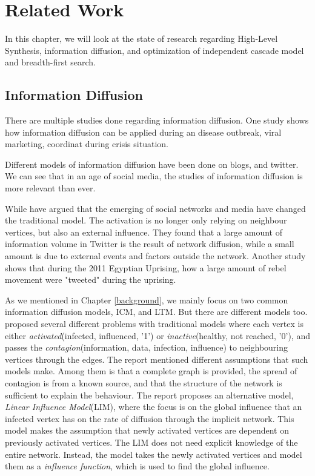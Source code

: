 \chapter{Related Work}  \label{relatedWork}


In this chapter, we will look at the state of research regarding High-Level Synthesis, information diffusion, and optimization of independent cascade model and breadth-first search.

\section{Information Diffusion} 
There are multiple studies done regarding information diffusion. One study shows how information diffusion can be applied during an disease outbreak\cite{InformationDiffusionThroughBlogspace}, viral marketing\cite{ViralMarketing}, coordinat during crisis situation\cite{Starbird:2012:RRI:2145204.2145212}. 

Different models of information diffusion have been done on blogs\citep{Adar:2005:TIE:1092358.1092473}\cite{GomezRodriguez:2010:IND:1835804.1835933}, and twitter\cite{Bakshy:2011:EIQ:1935826.1935845}. We can see that in an age of social media, the studies of information diffusion is more relevant than ever. 

While \cite{InfoDiffAndExternalInfluInNetworks} have argued that the emerging of social networks and media have changed the traditional model. The activation is no longer only relying on neighbour vertices, but also an external influence. They found that a large amount of information volume in Twitter is the result of network diffusion, while a small amount is due to external events and factors outside the network\citep{InfoDiffAndExternalInfluInNetworks}. Another study shows that during the 2011 Egyptian Uprising, how a large amount of rebel movement were "tweeted"\cite{Starbird:2012:RRI:2145204.2145212} during the uprising.

As we mentioned in Chapter \ref{background}, we mainly focus on two common information diffusion models, ICM, and LTM. But there are different models too. \cite{5694014} proposed several different problems with traditional models where each vertex is either \textit{activated}(infected, influenced, '1') or \textit{inactive}(healthy, not reached, '0'), and passes the \textit{contagion}(information, data, infection, influence) to neighbouring vertices through the edges. The report mentioned different assumptions that such models make. Among them is that a complete graph is provided, the spread of contagion is from a known source, and that the structure of the network is sufficient to explain the behaviour\citep{5694014}. The report proposes an alternative model, \textit{Linear Influence Model}(LIM), where the focus is on the global influence that an infected vertex has on the rate of diffusion through the implicit network. This model makes the assumption that newly activated vertices are dependent on previously activated vertices. The LIM does not need explicit knowledge of the entire network. Instead, the model takes the newly activated vertices and model them as a \textit{influence function}, which is used to find the global influence.     

